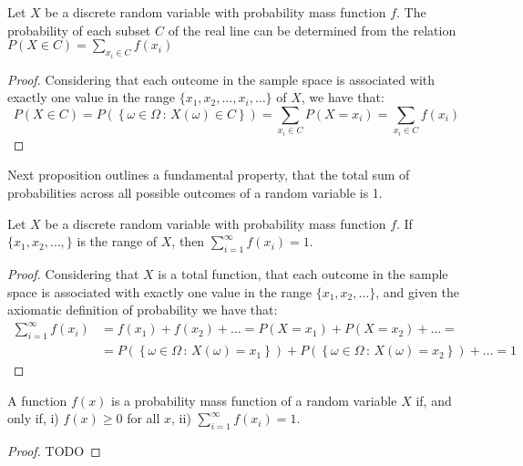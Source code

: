 \begin{proposition}
Let $X$ be a discrete random variable with probability mass function $f$. The probability of each subset $C$ of the real line can be determined from the relation $P\left(X\in C\right)=\sum_{x_{i}\in C}f\left(x_{i}\right)$
\end{proposition}
\begin{proof}
Considering that each outcome in the sample space is associated with exactly one value in the range $\{ x_1, x_2, \ldots, x_i, \ldots \}$ of $X$, we have that:
\[
P\left(X\in C\right) = P \left( \left\{ \omega \in \Omega \,:\, X \left( \omega \right) \in C\right\} \right) = \sum_{x_{i}\in C} P\left( X = x_i \right) = \sum_{x_{i}\in C}f\left(x_{i}\right)
\]
\end{proof}

Next proposition outlines a fundamental property, that the total sum of probabilities across all possible outcomes of a random variable is 1.

\begin{proposition}
Let $X$ be a discrete random variable with probability mass function $f$. If $\{ x_1, x_2, \ldots, \}$ is the range of $X$, then $\sum_{i=1}^{\infty}f\left(x_{i}\right)=1$.
\end{proposition}
\begin{proof}
Considering that $X$ is a total function, that each outcome in the sample space is associated with exactly one value in the range $\{ x_1, x_2, \ldots \}$, and given the axiomatic definition of probability we have that:
\begin{equation*}
\begin{split}
\sum_{i=1}^{\infty} f(x_i) & = f(x_1) + f(x_2) + \ldots = P\left( X = x_1 \right) + P\left( X = x_2 \right) + \ldots = \\
&  = P \left( \left\{ \omega \in \Omega \,:\, X \left( \omega \right) = x_1 \right\} \right) + P \left( \left\{ \omega \in \Omega \,:\, X \left( \omega \right) = x_2 \right\} \right) + \ldots = 1 
\end{split}
\end{equation*}
\end{proof}

{\color{red}
\begin{proposition}
A function $f(x)$ is a probability mass function of a random variable $X$ if, and only if, i) $f(x) \geq 0$ for all $x$, ii) $\sum_{i=1}^{\infty} f(x_i) = 1$.
\end{proposition}
\begin{proof}
TODO
\end{proof}
}

